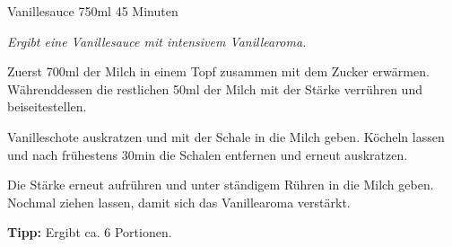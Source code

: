 \begin{recipe}{Vanillesauce} {750ml} {45 Minuten}

\freeform
\textit{Ergibt eine Vanillesauce mit intensivem Vanillearoma.}


Zuerst 700ml der Milch in einem Topf zusammen mit dem Zucker erwärmen.
Währenddessen die restlichen 50ml der Milch mit der Stärke verrühren und beiseitestellen.

\newstep
Vanilleschote auskratzen und mit der Schale in die Milch geben.
Köcheln lassen und nach frühestens 30min die Schalen entfernen und erneut auskratzen.

\newstep
Die Stärke erneut aufrühren und unter ständigem Rühren in die Milch geben.
Nochmal ziehen lassen, damit sich das Vanillearoma verstärkt.

\freeform
\hrulefill

\freeform
\textbf{Tipp:}
Ergibt ca. 6 Portionen.

\end{recipe}
